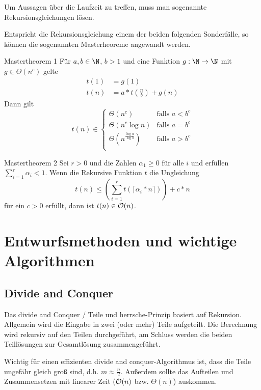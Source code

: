 Um Aussagen über die Laufzeit zu treffen, muss man sogenannte Rekursionsgleichungen lösen.

Entspricht die Rekursionsgleichung einem der beiden folgenden Sonderfälle, so können die sogenannten Masterheoreme angewandt werden.
\begin{satz}{Mastertheorem 1}
	Für $a,b\in\N$, $b>1$ und eine Funktion $g:\N\rightarrow \N$ mit $g\in\Theta(n^c)$ gelte
	\begin{align*}
		t(1)&=g(1)\\
		t(n)&=a*t\left(\frac nb\right)+g(n)
	\end{align*}
	Dann gilt 
	\begin{equation*}
		t(n)\in\begin{cases}
		\Theta(n^c)&\text{falls }a<b^c\\
		\Theta(n^c\log n)&\text{falls }a=b^c\\
		\Theta(n^{\frac{\log a}{\log b}})&\text{falls }a>b^c\\
		\end{cases}
	\end{equation*}
\end{satz}

\begin{satz}{Mastertheorem 2}
	Sei $r>0$ und die Zahlen $\alpha_1\geq 0$ für alle $i$ und erfüllen $\sum_{i=1}^r\alpha_i<1$.
	Wenn die Rekursive Funktion $t$ die Ungleichung
	\begin{equation*}
		t(n)\leq \left( \sum_{i=1}^r t(\lceil \alpha_i*n\rceil) \right)+c*n
	\end{equation*}
	für ein $c>0$ erfüllt, dann ist $t(n)\in\mathcal O(n)$.
\end{satz}


\chapter{Entwurfsmethoden und wichtige Algorithmen}
\section{Divide and Conquer}
Das divide and Conquer / Teile und herrsche-Prinzip basiert auf Rekursion. Allgemein wird die Eingabe in zwei (oder mehr) Teile aufgeteilt. Die Berechnung wird rekursiv auf den Teilen durchgeführt, am Schluss werden die beiden Teillösungen zur Gesamtlösung zusammengeführt.

Wichtig für einen effizienten divide and conquer-Algorithmus ist, dass die Teile ungefähr gleich groß sind, d.h. $m\approx \frac n2$. Außerdem sollte das Aufteilen und Zusammensetzen mit linearer Zeit ($\mathcal O(n)$ bzw. $\Theta(n)$) auskommen.


